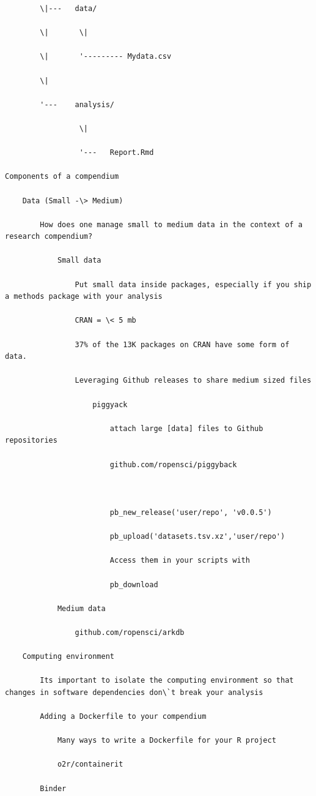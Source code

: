 \documentclass[
]{book}
\begin{document}
\begin{verbatim}
        \|---   data/

        \|       \|

        \|       '--------- Mydata.csv

        \|

        '---    analysis/

                 \|

                 '---   Report.Rmd

Components of a compendium

    Data (Small -\> Medium)

        How does one manage small to medium data in the context of a research compendium?

            Small data

                Put small data inside packages, especially if you ship a methods package with your analysis

                CRAN = \< 5 mb

                37% of the 13K packages on CRAN have some form of data.

                Leveraging Github releases to share medium sized files

                    piggyack

                        attach large [data] files to Github repositories

                        github.com/ropensci/piggyback



                        pb_new_release('user/repo', 'v0.0.5')

                        pb_upload('datasets.tsv.xz','user/repo')

                        Access them in your scripts with

                        pb_download

            Medium data

                github.com/ropensci/arkdb

    Computing environment

        Its important to isolate the computing environment so that changes in software dependencies don\`t break your analysis

        Adding a Dockerfile to your compendium

            Many ways to write a Dockerfile for your R project

            o2r/containerit

        Binder


\end{verbatim}
\end{document}
